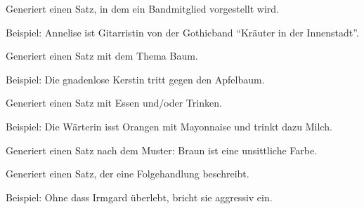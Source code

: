 \documentclass[a4paper,12pt,oneside]{sphinxmanual}
\begin{document}

\begin{fulllineitems}
\label{module:pyzufall.satz.satz_band_mitglied}
Generiert einen Satz, in dem ein Bandmitglied vorgestellt wird.

Beispiel: Annelise ist Gitarristin von der Gothicband ``Kräuter in der Innenstadt''.

\end{fulllineitems}


\begin{fulllineitems}
\label{module:pyzufall.satz.satz_baum}
Generiert einen Satz mit dem Thema Baum.

Beispiel: Die gnadenlose Kerstin tritt gegen den Apfelbaum.

\end{fulllineitems}


\begin{fulllineitems}
\label{module:pyzufall.satz.satz_essen}
Generiert einen Satz mit Essen und/oder Trinken.

Beispiel: Die Wärterin isst Orangen mit Mayonnaise und trinkt dazu Milch.

\end{fulllineitems}


\begin{fulllineitems}
\label{module:pyzufall.satz.satz_farbe}
Generiert einen Satz nach dem Muster: Braun ist eine unsittliche Farbe.

\end{fulllineitems}


\begin{fulllineitems}
\label{module:pyzufall.satz.satz_folgehandlung}
Generiert einen Satz, der eine Folgehandlung beschreibt.

Beispiel: Ohne dass Irmgard überlebt, bricht sie aggressiv ein.

\end{fulllineitems}
\end{document}
